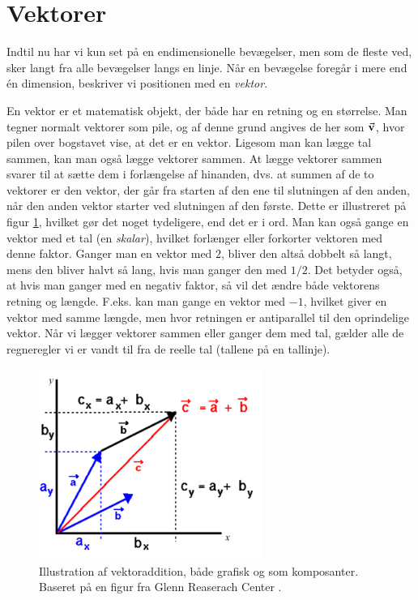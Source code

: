 \section{Vektorer} \label{sec:vektorer}
Indtil nu har vi kun set på en endimensionelle bevægelser, men som de fleste ved, sker langt fra alle bevægelser langs en linje. Når en bevægelse foregår i mere end én dimension, beskriver vi positionen med en {\em vektor}.

En vektor er et matematisk objekt, der både har en retning og en størrelse.
Man tegner normalt vektorer som pile, og af denne grund angives de  her som $\va v$, hvor pilen over bogstavet vise, at det er en vektor.
Ligesom man kan lægge tal sammen, kan man også lægge vektorer sammen.
At lægge vektorer sammen svarer til at sætte dem i forlængelse af hinanden,
dvs. at summen af de to vektorer er den vektor, der går fra starten af den ene til slutningen af den anden, når den anden vektor starter ved slutningen af den første. Dette er illustreret på figur \ref{fig:mat:vakadd}, hvilket gør det noget tydeligere, end det er i ord.
Man kan også gange en vektor med et tal (en {\em skalar}), hvilket forlænger eller forkorter vektoren med denne faktor. Ganger man en vektor med $2$, bliver den altså dobbelt så langt, mens den bliver halvt så lang, hvis man ganger den med $1/2$. Det betyder også, at hvis man ganger med en negativ faktor, så vil det ændre både vektorens retning og længde. F.eks. kan man gange en vektor med $-1$, hvilket giver en vektor med samme længde, men hvor retningen er antiparallel til den oprindelige vektor. 
Når vi lægger vektorer sammen eller ganger dem med tal, gælder alle de regneregler vi er vandt til fra de reelle tal (tallene på en tallinje).

\begin{figure} [h!]
    \centering
    \includegraphics[width = 0.65\textwidth]{Mat/matfig/vektoraddition.png}
    \caption{Illustration af vektoraddition, både grafisk og som komposanter. Baseret på en figur fra {Glenn Reaserach Center} \cite{VectorAddition}.}
    \label{fig:mat:vakadd}
\end{figure}

